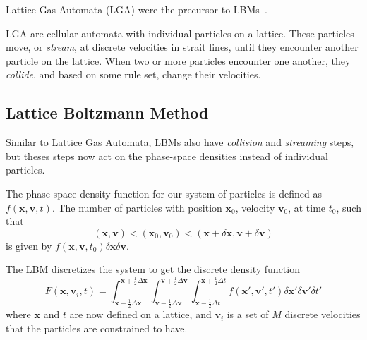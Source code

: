 Lattice Gas Automata (LGA) were the precursor to LBMs~\cite{sukop_lattice_2006}.

LGA are cellular automata with individual particles on a lattice. These particles move, or \emph{stream}, at discrete velocities in strait lines, until they encounter another particle on the lattice. When two or more particles encounter one another, they \emph{collide}, and based on some rule set, change their velocities.


\subsection{Lattice Boltzmann Method}\label{sec:introduction::lattice-boltzmann-method}
Similar to Lattice Gas Automata, LBMs also have \emph{collision} and \emph{streaming} steps, but theses steps now act on the phase-space densities instead of individual particles.

The phase-space density\footnotemark{} function for our system of particles is defined as $f(\mathbf x, \mathbf v, t)$.
The number\footnotemark{} of particles with position $\mathbf x_{0}$, velocity $\mathbf v_{0}$, at time $t_{0}$, such that
\begin{equation}
  (\mathbf x, \mathbf v) < (\mathbf x_{0}, \mathbf v_{0}) < (\mathbf x + \delta \mathbf x, \mathbf v + \delta \mathbf v)
\end{equation}
is given by $f(\mathbf x,\mathbf v, t_{0})\delta \mathbf x \delta \mathbf v$.

The LBM discretizes the system to get the discrete density function
\begin{equation}
F(\mathbf x, \mathbf v_{i}, t) = \int_{\mathbf x - \frac{1}{2}\Delta \mathbf x}^{\mathbf x + \frac{1}{2}\Delta \mathbf x}\int_{\mathbf v - \frac{1}{2}\Delta \mathbf v}^{\mathbf v + \frac{1}{2}\Delta \mathbf v}\int_{\mathbf x - \frac{1}{2}\Delta t}^{\mathbf x + \frac{1}{2}\Delta t} f(\mathbf x', \mathbf v', t') \delta \mathbf x' \delta \mathbf v' \delta t'
\end{equation}
where $\mathbf x$ and $t$ are now defined on a lattice, and $\mathbf v_{i}$ is a set of $M$ discrete velocities that the particles are constrained to have.

